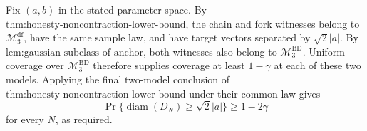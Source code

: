 Fix \((a,b)\) in the stated parameter space.  By \(\text{thm:honesty-noncontraction-lower-bound}\), the chain and fork witnesses belong to \(\mathcal M_3^{\mathrm{df}}\), have the same sample law, and have target vectors separated by \(\sqrt2|a|\).  By \(\text{lem:gaussian-subclass-of-anchor}\), both witnesses also belong to \(\mathcal M_3^{\mathrm{BD}}\).  Uniform coverage over \(\mathcal M_3^{\mathrm{BD}}\) therefore supplies coverage at least \(1-\gamma\) at each of these two models.  Applying the final two-model conclusion of \(\text{thm:honesty-noncontraction-lower-bound}\) under their common law gives
\[
 \Pr\{\operatorname{diam}(D_N)\ge\sqrt2|a|\}\ge1-2\gamma
\]
for every \(N\), as required.